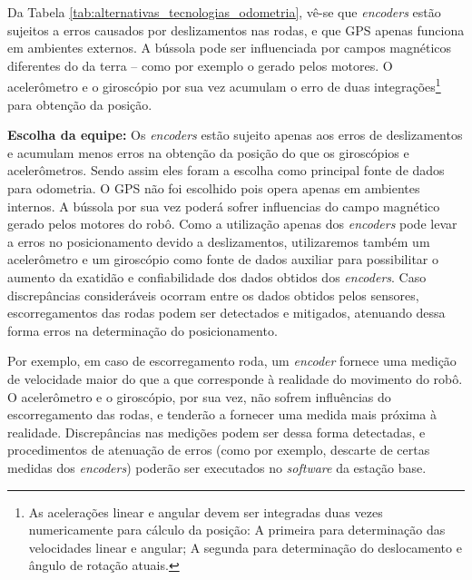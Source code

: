 Da Tabela \ref{tab:alternativas_tecnologias_odometria}, vê-se que \textit{encoders} estão sujeitos a erros causados por deslizamentos nas rodas, e que GPS apenas funciona em ambientes externos. A bússola pode ser influenciada por campos magnéticos diferentes do da terra -- como por exemplo o gerado pelos motores. O acelerômetro e o giroscópio por sua vez acumulam o erro de duas integrações\footnote{As acelerações linear e angular devem ser integradas duas vezes numericamente para cálculo da posição: A primeira para determinação das velocidades linear e angular; A segunda para determinação do deslocamento e ângulo de rotação atuais.} para obtenção da posição.

\textbf{Escolha da equipe:} Os \textit{encoders} estão sujeito apenas aos erros de deslizamentos e acumulam menos erros na obtenção da posição do que os giroscópios e acelerômetros. Sendo assim eles foram a escolha como principal fonte de dados para odometria. O GPS não foi escolhido pois opera apenas em ambientes internos. A bússola por sua vez poderá sofrer influencias do campo magnético gerado pelos motores do robô. Como a utilização apenas dos \textit{encoders} pode levar a erros no posicionamento devido a deslizamentos, utilizaremos também um acelerômetro e um giroscópio como fonte de dados auxiliar para possibilitar o aumento da exatidão e confiabilidade dos dados obtidos dos \textit{encoders}. Caso discrepâncias consideráveis ocorram entre os dados obtidos pelos sensores, escorregamentos das rodas podem ser detectados e mitigados, atenuando dessa forma erros na determinação do posicionamento.

Por exemplo, em caso de escorregamento roda, um \textit{encoder} fornece uma medição de velocidade maior do que a que corresponde à realidade do movimento do robô. O acelerômetro e o giroscópio, por sua vez, não sofrem influências do escorregamento das rodas, e tenderão a fornecer uma medida mais próxima à realidade. Discrepâncias nas medições podem ser dessa forma detectadas, e procedimentos de atenuação de erros (como por exemplo, descarte de certas medidas dos \textit{encoders}) poderão ser executados no \textit{software} da estação base.


